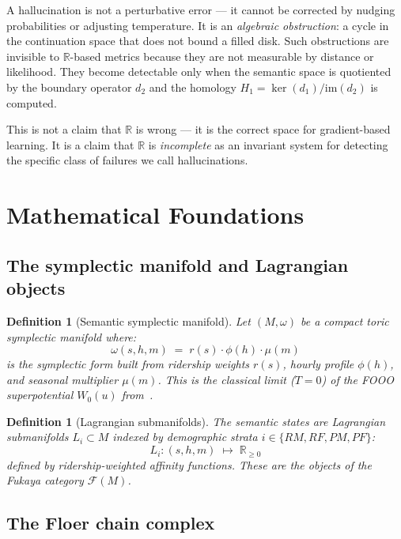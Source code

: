 \documentclass[11pt,a4paper]{article}
\newtheorem{definition}[theorem]{Definition}
\newcommand{\Fuk}{\mathcal{F}}
\begin{document}
A hallucination is not a perturbative error --- it cannot be corrected
by nudging probabilities or adjusting temperature.
It is an \emph{algebraic obstruction}: a cycle in the continuation space
that does not bound a filled disk.
Such obstructions are invisible to $\mathbb{R}$-based metrics because they
are not measurable by distance or likelihood.
They become detectable only when the semantic space is quotiented by the
boundary operator $d_2$ and the homology $H_1 = \ker(d_1)/\mathrm{im}(d_2)$
is computed.

This is not a claim that $\mathbb{R}$ is wrong --- it is the correct space
for gradient-based learning.
It is a claim that $\mathbb{R}$ is \emph{incomplete} as an invariant system
for detecting the specific class of failures we call hallucinations.

\section{Mathematical Foundations}

\subsection{The symplectic manifold and Lagrangian objects}

\begin{definition}[Semantic symplectic manifold]
Let $(M, \omega)$ be a compact toric symplectic manifold where:
\[
  \omega(s,h,m) \;=\; r(s)\cdot\phi(h)\cdot\mu(m)
\]
is the symplectic form built from ridership weights $r(s)$,
hourly profile $\phi(h)$, and seasonal multiplier $\mu(m)$.
This is the classical limit ($T=0$) of the FOOO superpotential
$W_0(u)$ from~\cite{FOOO}.
\end{definition}

\begin{definition}[Lagrangian submanifolds]
The \emph{semantic states} are Lagrangian submanifolds
$L_i \subset M$ indexed by demographic strata
$i \in \{RM, RF, PM, PF\}$:
\[
  L_i : (s,h,m) \;\mapsto\; \mathbb{R}_{\geq 0}
\]
defined by ridership-weighted affinity functions. These are the
objects of the Fukaya category $\Fuk(M)$.
\end{definition}

\subsection{The Floer chain complex}
\end{document}
